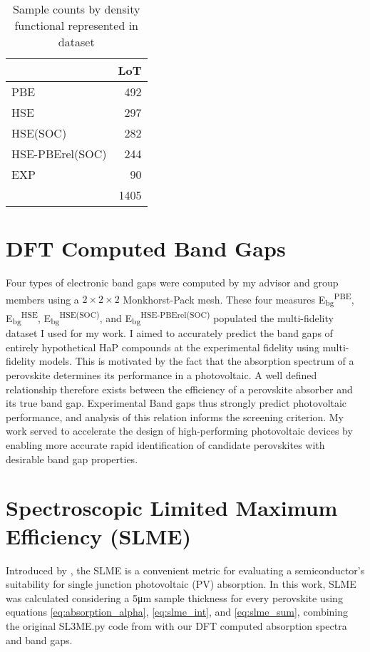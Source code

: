  
\begin{table}[htbp]
\caption{\label{tbl:LoTs} Sample counts by density functional represented in dataset}
\centering
\begin{tabular}{lr}
 & LoT\\[0pt]
\hline
PBE & 492\\[0pt]
HSE & 297\\[0pt]
HSE(SOC) & 282\\[0pt]
HSE-PBErel(SOC) & 244\\[0pt]
EXP & 90\\[0pt]
\hline
 & 1405\\[0pt]
\end{tabular}
\end{table}

\section{DFT Computed Band Gaps}
\label{sec:org7daa035}
Four types of electronic band gaps were computed by my advisor and group members using a \(2\times{}2\times{}2\) Monkhorst-Pack mesh.
These four measures E\textsubscript{bg}\textsuperscript{PBE}, E\textsubscript{bg}\textsuperscript{HSE}, E\textsubscript{bg}\textsuperscript{HSE(SOC)}, and E\textsubscript{bg}\textsuperscript{HSE-PBErel(SOC)} populated the multi-fidelity dataset I used for my work.
I aimed to accurately predict the band gaps of entirely hypothetical HaP compounds at the experimental fidelity using multi-fidelity models. 
This is motivated by the fact that the absorption spectrum of a perovskite determines its performance in a photovoltaic.
\autocite{mannodi-kanakkithodi-2019-compr-comput}
A well defined relationship therefore exists between the efficiency of a perovskite absorber and its true band gap.
\autocite{yu-2012-ident-poten}
Experimental Band gaps thus strongly predict photovoltaic performance, and analysis of this relation informs the screening criterion.
My work served to accelerate the design of high-performing photovoltaic devices by enabling more accurate rapid identification of candidate perovskites with desirable band gap properties.

\section{Spectroscopic Limited Maximum Efficiency (SLME)}
\label{sec:org67dad11}
Introduced by \textcite{yu-2012-ident-poten}, the SLME is a convenient metric for evaluating a semiconductor's suitability for single junction photovoltaic (PV) absorption.
In this work, SLME was calculated considering a 5\unit{\micro\meter} sample thickness for every perovskite using equations \ref{eq:absorption_alpha}, \ref{eq:slme_int}, and \ref{eq:slme_sum}, combining the original SL3ME.py code from \textcite{yu-2012-ident-poten} with our DFT computed absorption spectra and band gaps.

